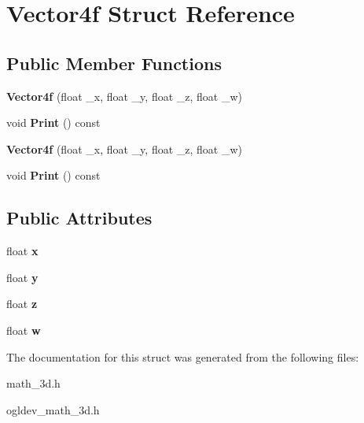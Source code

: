 \hypertarget{structVector4f}{\section{Vector4f Struct Reference}
\label{structVector4f}
}
\subsection*{Public Member Functions}
\begin{DoxyCompactItemize}
\item 
\hypertarget{structVector4f_a5e8dc9a81210c2b8ec88435eff921b6b}{{\bfseries Vector4f} (float \-\_\-x, float \-\_\-y, float \-\_\-z, float \-\_\-w)}\label{structVector4f_a5e8dc9a81210c2b8ec88435eff921b6b}

\item 
\hypertarget{structVector4f_a76c3f9836dc5d9918143ca36b097b23e}{void {\bfseries Print} () const }\label{structVector4f_a76c3f9836dc5d9918143ca36b097b23e}

\item 
\hypertarget{structVector4f_a5e8dc9a81210c2b8ec88435eff921b6b}{{\bfseries Vector4f} (float \-\_\-x, float \-\_\-y, float \-\_\-z, float \-\_\-w)}\label{structVector4f_a5e8dc9a81210c2b8ec88435eff921b6b}

\item 
\hypertarget{structVector4f_a76c3f9836dc5d9918143ca36b097b23e}{void {\bfseries Print} () const }\label{structVector4f_a76c3f9836dc5d9918143ca36b097b23e}

\end{DoxyCompactItemize}
\subsection*{Public Attributes}
\begin{DoxyCompactItemize}
\item 
\hypertarget{structVector4f_aa12ac7deb0b3bbfd1f78595393592c75}{float {\bfseries x}}\label{structVector4f_aa12ac7deb0b3bbfd1f78595393592c75}

\item 
\hypertarget{structVector4f_a2cf6c2d5ccda2f11bf6c19d6f539212f}{float {\bfseries y}}\label{structVector4f_a2cf6c2d5ccda2f11bf6c19d6f539212f}

\item 
\hypertarget{structVector4f_ac85e1275d735582090ff4285051df951}{float {\bfseries z}}\label{structVector4f_ac85e1275d735582090ff4285051df951}

\item 
\hypertarget{structVector4f_abbdbc0c1fd1b7d376117379f8e84dcd4}{float {\bfseries w}}\label{structVector4f_abbdbc0c1fd1b7d376117379f8e84dcd4}

\end{DoxyCompactItemize}


The documentation for this struct was generated from the following files\-:\begin{DoxyCompactItemize}
\item 
math\-\_\-3d.\-h\item 
ogldev\-\_\-math\-\_\-3d.\-h\end{DoxyCompactItemize}
